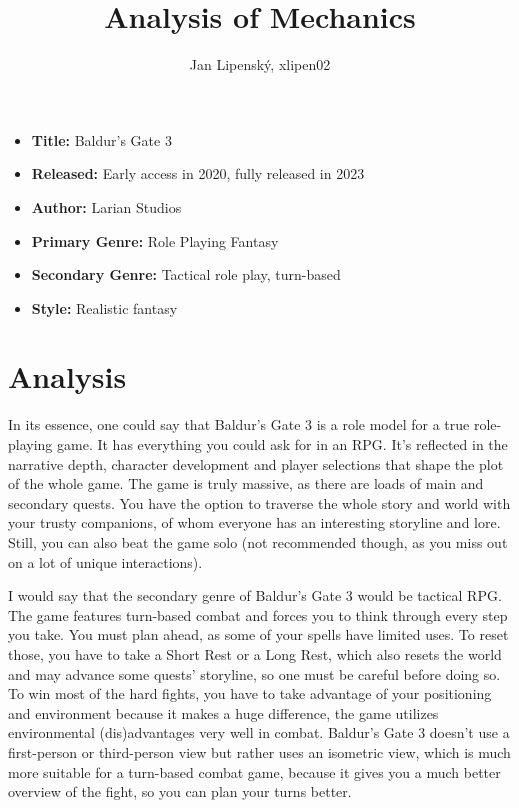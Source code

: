 \documentclass[a4paper,11pt,english]{article}
\title{%
Analysis of Mechanics%
}
\author{%
Jan Lipenský, xlipen02%
}
\date{}
\begin{document}
\maketitle
\thispagestyle{empty}

{%
\large

\begin{itemize}

\item[] \textbf{Title:} Baldur's Gate 3

\item[] \textbf{Released:} Early access in 2020, fully released in 2023

\item[] \textbf{Author:} Larian Studios

\item[] \textbf{Primary Genre:} Role Playing Fantasy

\item[] \textbf{Secondary Genre:} Tactical role play, turn-based

\item[] \textbf{Style:} Realistic fantasy

\end{itemize}

}

\section*{\centering Analysis}

  

In its essence, one could say that Baldur’s Gate 3 is a role model for a true role-playing game. It has everything you could ask for in an RPG. It’s reflected in the narrative depth, character development and player selections that shape the plot of the whole game. The game is truly massive, as there are loads of main and secondary quests. You have the option to traverse the whole story and world with your trusty companions, of whom everyone has an interesting storyline and lore. Still, you can also beat the game solo (not recommended though, as you miss out on a lot of unique interactions).

I would say that the secondary genre of Baldur’s Gate 3 would be tactical RPG. The game features turn-based combat and forces you to think through every step you take. You must plan ahead, as some of your spells have limited uses. To reset those, you have to take a 
Short Rest or a Long Rest, which also resets the world and may advance some quests' storyline, so one must be careful before doing so. To win most of the hard fights, you have to take advantage of your positioning and environment because it makes a huge difference, the game utilizes environmental (dis)advantages very well in combat. Baldur’s Gate 3 doesn’t use a first-person or third-person view but rather uses an isometric view, which is much more suitable for a turn-based combat game, because it gives you a much better overview of the fight, so you can plan your turns better. 
\end{document}
